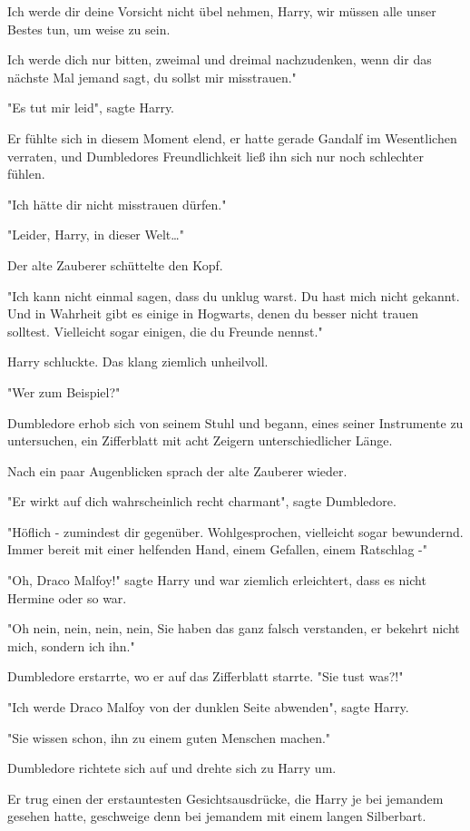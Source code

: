 {Ich werde dir deine Vorsicht nicht übel nehmen, Harry, wir müssen alle unser Bestes tun, um weise zu sein.

Ich werde dich nur bitten, zweimal und dreimal nachzudenken, wenn dir das nächste Mal jemand sagt, du sollst mir misstrauen."

"Es tut mir leid", sagte Harry.

Er fühlte sich in diesem Moment elend, er hatte gerade Gandalf im Wesentlichen verraten, und Dumbledores Freundlichkeit ließ ihn sich nur noch schlechter fühlen.

"Ich hätte dir nicht misstrauen dürfen."

"Leider, Harry, in dieser Welt…"

Der alte Zauberer schüttelte den Kopf.

"Ich kann nicht einmal sagen, dass du unklug warst. Du hast mich nicht gekannt. Und in Wahrheit gibt es einige in Hogwarts, denen du besser nicht trauen solltest. Vielleicht sogar einigen, die du Freunde nennst."

Harry schluckte. Das klang ziemlich unheilvoll.

"Wer zum Beispiel?"

Dumbledore erhob sich von seinem Stuhl und begann, eines seiner Instrumente zu untersuchen, ein Zifferblatt mit acht Zeigern unterschiedlicher Länge.

Nach ein paar Augenblicken sprach der alte Zauberer wieder.

"Er wirkt auf dich wahrscheinlich recht charmant", sagte Dumbledore.

"Höflich - zumindest dir gegenüber. Wohlgesprochen, vielleicht sogar bewundernd. Immer bereit mit einer helfenden Hand, einem Gefallen, einem Ratschlag -"

"Oh, Draco Malfoy!" sagte Harry und war ziemlich erleichtert, dass es nicht Hermine oder so war.

"Oh nein, nein, nein, nein, Sie haben das ganz falsch verstanden, er bekehrt nicht mich, sondern ich ihn."

Dumbledore erstarrte, wo er auf das Zifferblatt starrte. "Sie tust was?!"

"Ich werde Draco Malfoy von der dunklen Seite abwenden", sagte Harry.

"Sie wissen schon, ihn zu einem guten Menschen machen."

Dumbledore richtete sich auf und drehte sich zu Harry um.

Er trug einen der erstauntesten Gesichtsausdrücke, die Harry je bei jemandem gesehen hatte, geschweige denn bei jemandem mit einem langen Silberbart.

}
